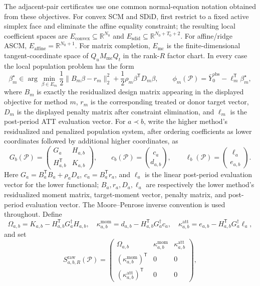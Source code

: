 \documentclass[11pt]{article}
\newcommand{\transpose}{\mathsf{T}}
\newcommand{\R}{\mathbb{R}}
\theoremstyle{definition}
\theoremstyle{plain}
\theoremstyle{remark}
\begin{document}
The adjacent-pair certificates use one common normal-equation notation obtained from these objectives. For convex SCM and SDiD, first restrict to a fixed active simplex face and eliminate the affine equality constraint; the resulting local coefficient spaces are \(E_{\mathrm{convex}}\subseteq\R^{N_0}\) and \(E_{\mathrm{sdid}}\subseteq\R^{N_0+T_0+2}\). For affine/ridge ASCM, \(E_{\mathrm{affine}}=\R^{N_0+1}\). For matrix completion, \(E_{\mathrm{mc}}\) is the finite-dimensional tangent-coordinate space of \(Q_uM_{\mathrm{mc}}Q_t\) in the rank-\(R\) factor chart. In every case the local population problem has the form
\[
\beta_m^\star\in\arg\min_{\beta\in E_m}
\frac12\|B_m\beta-r_m\|_2^2+\frac12\rho_m\beta^\transpose D_m\beta,\qquad
\phi_m(\mathcal P)=\bar Y^{\mathrm{obs}}_0-\ell_m^\transpose\beta_m^\star,
\]
where \(B_m\) is exactly the residualized design matrix appearing in the displayed objective for method \(m\), \(r_m\) is the corresponding treated or donor target vector, \(D_m\) is the displayed penalty matrix after constraint elimination, and \(\ell_m\) is the post-period ATT evaluation vector. For \(a\prec b\), write the higher method's residualized and penalized population system, after ordering coefficients as lower coordinates followed by additional higher coordinates, as
\[
G_b(\mathcal P)=
\begin{pmatrix}
G_a & H_{a,b}\\
H_{a,b}^\transpose & K_{a,b}
\end{pmatrix},\qquad
c_b(\mathcal P)=\binom{c_a}{d_{a,b}},\qquad
\ell_b(\mathcal P)=\binom{\ell_a}{e_{a,b}}.
\]
Here \(G_a=B_a^\transpose B_a+\rho_aD_a\), \(c_a=B_a^\transpose r_a\), and \(\ell_a\) is the linear post-period evaluation vector for the lower functional; \(B_a,r_a,D_a,\ell_a\) are respectively the lower method's residualized moment matrix, target-moment vector, penalty matrix, and post-period evaluation vector. The Moore--Penrose inverse convention is used throughout. Define
\[
\Omega_{a,b}=K_{a,b}-H_{a,b}^\transpose G_a^\dagger H_{a,b},\quad
\kappa^{\mathrm{mom}}_{a,b}=d_{a,b}-H_{a,b}^\transpose G_a^\dagger c_a,\quad
\kappa^{\mathrm{att}}_{a,b}=e_{a,b}-H_{a,b}^\transpose G_a^\dagger \ell_a,
\]
and set
\[
S^{\mathrm{raw}}_{a,b,R}(\mathcal P)=
\begin{pmatrix}
\Omega_{a,b} & \kappa^{\mathrm{mom}}_{a,b} & \kappa^{\mathrm{att}}_{a,b}\\
(\kappa^{\mathrm{mom}}_{a,b})^\transpose & 0 & 0\\
(\kappa^{\mathrm{att}}_{a,b})^\transpose & 0 & 0
\end{pmatrix},
\]
\end{document}
